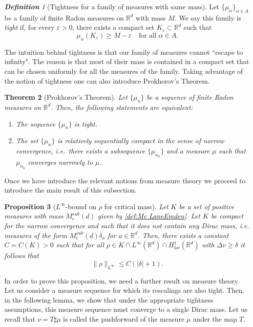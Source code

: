 \documentclass[11pt,a4paper]{article}
\numberwithin{equation}{section}
\newcommand{\R}{{\mathbb{R}}}
\theoremstyle{plain}
\newtheorem{theorem}{Theorem}[section]
\newtheorem{proposition}[theorem]{Proposition}
\theoremstyle{remark}
\newtheorem{definition}[theorem]{\bf Definition}
\begin{document}
\begin{definition}[Tightness for a family of measures with same mass]
Let $\{\mu_\alpha\}_{\alpha\in A}$ be a family of finite Radon measures on $\mathbb{R}^d$ with mass $M$. We say this family is \emph{tight} if, for every $\varepsilon>0$, there exists a compact set $K_\varepsilon \subset \mathbb{R}^d$ such that
\[
\mu_\alpha\left(K_\varepsilon\right)  \ge M - \varepsilon
\quad
\text{for all }\alpha\in A.
\]
\end{definition}
The intuition behind tightness is that our family of measures cannot ``escape to infinity". The reason is that most of their mass is contained in a compact set that can be chosen uniformly for all the measures of the family. Taking advantage of the notion of tightness one can also introduce Prokhorov's Theorem.

\begin{theorem}[Prokhorov's Theorem]
Let $\{\mu_n\}$ be a sequence of finite Radon measures on $\mathbb{R}^d$. Then, the following statements are equivalent:
\begin{enumerate}
\item The sequence $\{\mu_n\}$ is tight.
\item The set $\{\mu_n\}$ is relatively sequentially compact in the sense of narrow convergence, i.e.\ there exists a subsequence $\{\mu_{n_k}\}$ and a measure $\mu$ such that $\mu_{n_k}$ converges narrowly to $\mu$. 
\end{enumerate}
\end{theorem}


Once we have introduce the relevant notions from measure theory we proceed to introduce the main result of this subsection.

\begin{proposition}[$L^\infty$-bound on $\rho$ for critical mass]\label{prop:linf_estimate_critical}
Let $K$ be a set of positive measures with mass $M^{sub}_c(d)$ given by \eqref{def:Mc LaneEmden}. Let $K$ be compact for the narrow convergence and such that it does not contain any  Dirac mass, i.e. measures of the form $M^{sub}_c(d)\delta_a$ for $a\in \R^d$.  Then, there exists a constant $C=C(K)>0$ such that for all $\rho\in K\cap L^\infty(\mathbb{R}^d)\cap H^{1}_{loc}(\R^d)$ with $
\Delta v \ge \delta$ 
it follows that
\[
\|\rho\|_{L^\infty}  \le C( |\delta|+1).
\]
\end{proposition}

In order to prove this proposition, we need a further result on measure theory. 
Let us consider a measure sequence for which its rescalings are also tight.
Then, in the following lemma, we show that under the appropriate tightness assumptions, this measure sequence must converge to a single Dirac mass. 
Let us recall that $\nu=T\sharp\mu$ is called the pushforward of the measure $\mu$ under the map $T$.
\end{document}
